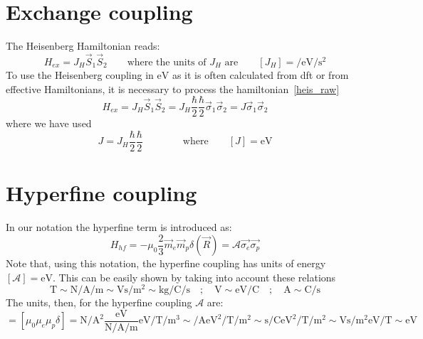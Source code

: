 \section{Exchange coupling}
The Heisenberg Hamiltonian reads:
\begin{equation}
  H_{ex} = J_H\vec{S}_1\vec{S}_2\qquad\text{where the units of $J_H$ are}\qquad
  [J_H]=\si{\per\eV\per\s\squared}
\label{heis_raw}
\end{equation}
To use the Heisenberg coupling in $\si{\eV}$ as it is often calculated from \ac{dft} or from effective Hamiltonians, it is necessary to process the hamiltonian~\eqref{heis_raw}
\begin{equation}
  H_{ex} = J_H\vec{S}_1\vec{S}_2 = J_H\frac{\hbar}{2}\frac{\hbar}{2}\vec{\sigma}_1\vec{\sigma}_2 =
  J\vec{\sigma}_1\vec{\sigma}_2
\end{equation}
where we have used
\begin{equation}
 J=J_H\frac{\hbar}{2}\frac{\hbar}{2}\qquad\qquad\text{where}\qquad [J]=\si{\eV}
\end{equation}


\section{Hyperfine coupling}
\label{units_A}
In our notation the hyperfine term is introduced as:
\begin{equation}
  H_{hf} = -\mu_0\frac{2}{3} \vec{m}_e\vec{m}_p\delta(\vec{R}) = \mathcal{A}\vec{\sigma_e}\vec{\sigma_p}
\end{equation}
Note that, using this notation, the hyperfine coupling has units of energy $[\mathcal{A}]=\si{\eV}$. This can be easily shown by taking into account these relations
\begin{equation}
  \si{\tesla} \sim
  \si{\newton\per\ampere\per\m}\sim\si{\volt\s\per\m\squared} \sim
  \si{\kilogram\per\coulomb\per\s}  \quad;\quad
  \si{\V}\sim\si{\eV\per\coulomb}  \quad;\quad
  \si{\ampere}\sim\si{\coulomb\per\s}
\end{equation}
The units, then, for the hyperfine coupling $\mathcal{A}$ are:
\begin{equation}
  [\mathcal{A}] = \left[\mu_0\mu_e\mu_p\delta\right] =
  \si{\newton\per\ampere\squared}\frac{\si{\eV}}{\si{\newton\per\ampere\per\m}}
  \si{\eV\per\tesla}\si{\per\m\cubed} \sim
  \si{\per\ampere}\si{\eV\squared\per\tesla}\si{\per\m\squared} \sim
  \si{\s\per\coulomb}\si{\eV\squared\per\tesla}\si{\per\m\squared} \sim
  \si{\V\s\per\m\squared}\si{\eV\per\tesla}\sim \si{\eV}
\end{equation}


